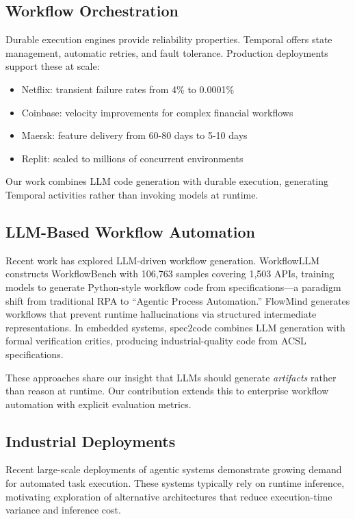 \documentclass[11pt]{article}
\begin{document}
\subsection{Workflow Orchestration}

Durable execution engines provide reliability properties. Temporal \citep{temporal2024} offers state management, automatic retries, and fault tolerance. Production deployments support these at scale:
\begin{itemize}
    \item Netflix: transient failure rates from 4\% to 0.0001\%
    \item Coinbase: velocity improvements for complex financial workflows
    \item Maersk: feature delivery from 60-80 days to 5-10 days
    \item Replit: scaled to millions of concurrent environments
\end{itemize}

Our work combines LLM code generation with durable execution, generating Temporal activities rather than invoking models at runtime.

\subsection{LLM-Based Workflow Automation}

Recent work has explored LLM-driven workflow generation. WorkflowLLM \citep{fan2024workflowllm} constructs WorkflowBench with 106,763 samples covering 1,503 APIs, training models to generate Python-style workflow code from specifications—a paradigm shift from traditional RPA to ``Agentic Process Automation.'' FlowMind \citep{zeng2024flowmind} generates workflows that prevent runtime hallucinations via structured intermediate representations. In embedded systems, spec2code \citep{patil2024spec2code} combines LLM generation with formal verification critics, producing industrial-quality code from ACSL specifications.

These approaches share our insight that LLMs should generate \textit{artifacts} rather than reason at runtime. Our contribution extends this to enterprise workflow automation with explicit evaluation metrics.

\subsection{Industrial Deployments}

Recent large-scale deployments of agentic systems demonstrate growing demand for automated task execution. These systems typically rely on runtime inference, motivating exploration of alternative architectures that reduce execution-time variance and inference cost.
\end{document}
